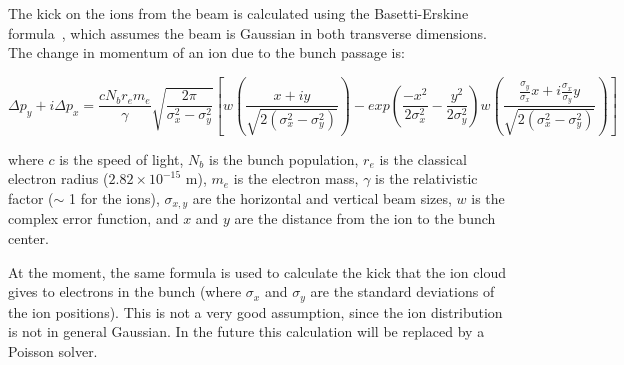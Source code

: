 The kick on the ions from the beam is calculated using the Basetti-Erskine formula~\cite{Bassetti}, which assumes the beam is Gaussian in both transverse dimensions.  The change in momentum of an ion due to the bunch passage is:

\begin{equation}
\Delta p_y + i \Delta p_x  = \frac{c N_b r_e m_e }{\gamma} \sqrt{\frac{2 \pi}{\sigma_x^2 - \sigma_y^2}} \left[ w\left(\frac{x + i y}{\sqrt{2 (\sigma_x^2 - \sigma_y^2)}}\right) 
   - exp\left(\frac{-x^2}{2 \sigma_x^2} - \frac{y^2}{2 \sigma_y^2}\right)  w\left(\frac{\frac{\sigma_y}{\sigma_x} x + i \frac{\sigma_x}{\sigma_y} y}{\sqrt{2 (\sigma_x^2 - \sigma_y^2)}}\right) \right]
\end{equation}

where $c$ is the speed of light, $N_b$ is the bunch population, $r_e$ is the classical electron radius ($2.82 \times 10^{-15}$ m), $m_e$ is the electron mass, $\gamma$ is the relativistic factor ($\sim$ 1 for the ions), $\sigma_{x,y}$ are the horizontal and vertical beam sizes, $w$ is the complex error function, and $x$ and $y$ are the distance from the ion to the bunch center.

At the moment, the same formula is used to calculate the kick that the ion cloud gives to electrons in the bunch (where $\sigma_x$ and $\sigma_y$ are the standard deviations of the ion positions).  This is not a very good assumption, since the ion distribution is not in general Gaussian.  In the future this calculation will be replaced by a Poisson solver.
